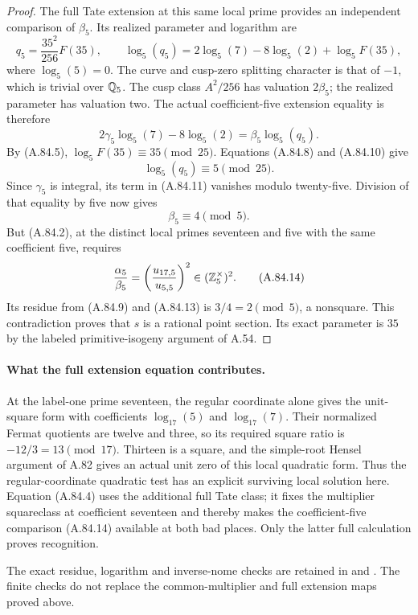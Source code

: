 \begin{proof}
The full Tate extension at this same local prime
provides an independent comparison of $\beta_5$.
Its realized parameter and logarithm are
\[
 q_5=\frac{35^2}{256}F(35),
 \qquad
 \log_5(q_5)=2\log_5(7)-8\log_5(2)+\log_5F(35),
\tag{A.84.10}
\]
where $\log_5(5)=0$.
The curve and cusp-zero splitting character is that
of $-1$, which is trivial over $\mathbb Q_5$.
The cusp class $A^2/256$ has valuation $2\beta_5$;
the realized parameter has valuation two.
The actual coefficient-five extension equality is therefore
\[
        2\gamma_5\log_5(7)-8\log_5(2)
                             =\beta_5\log_5(q_5).
\tag{A.84.11}
\]
By (A.84.5), $\log_5F(35)\equiv35\pmod{25}$.
Equations (A.84.8) and (A.84.10) give
\[
                         \log_5(q_5)\equiv5\pmod{25}.
\tag{A.84.12}
\]
Since $\gamma_5$ is integral, its term in (A.84.11)
vanishes modulo twenty-five.  Division of that equality
by five now gives
\[
                                      \beta_5\equiv4\pmod5.
\tag{A.84.13}
\]
But (A.84.2), at the distinct local primes seventeen
and five with the same coefficient five, requires
\[
                 \frac{\alpha_5}{\beta_5}
                       =\left(\frac{u_{17,5}}{u_{5,5}}\right)^2
                         \in(\mathbb Z_5^\times)^2.
\tag{A.84.14}
\]
Its residue from (A.84.9) and (A.84.13) is
$3/4=2\pmod5$, a nonsquare.
This contradiction proves that $s$ is a rational point
section.  Its exact parameter is $35$ by the labeled
primitive-isogeny argument of A.54.
\end{proof}

\paragraph{What the full extension equation contributes.}
At the label-one prime seventeen, the regular coordinate
alone gives the unit-square form with coefficients
$\log_{17}(5)$ and $\log_{17}(7)$.
Their normalized Fermat quotients are twelve and three,
so its required square ratio is $-12/3=13\pmod{17}$.
Thirteen is a square, and the simple-root Hensel argument
of A.82 gives an actual unit zero of this local quadratic
form.  Thus the regular-coordinate quadratic test has
an explicit surviving local solution here.
Equation (A.84.4) uses the additional full Tate class;
it fixes the multiplier squareclass at coefficient
seventeen and thereby makes the coefficient-five
comparison (A.84.14) available at both bad places.
Only the latter full calculation proves recognition.

The exact residue, logarithm and inverse-nome checks
are retained in
and .
The finite checks do not replace the common-multiplier
and full extension maps proved above.
